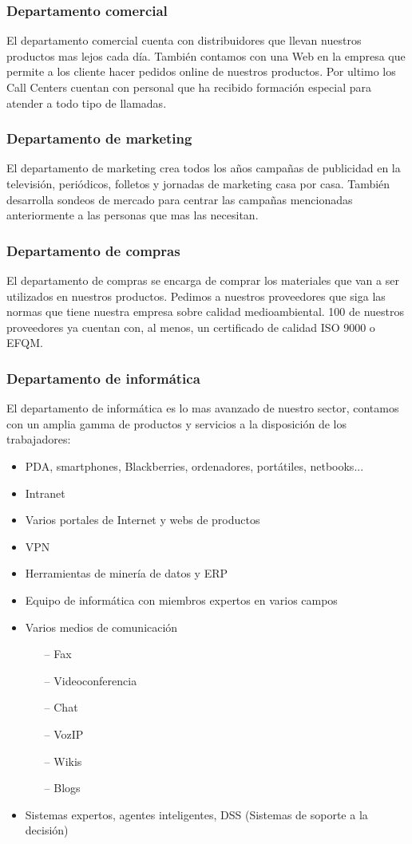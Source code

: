 \documentclass[twoside]{article}
\begin{document}
\subsubsection{Departamento comercial}
El departamento comercial cuenta con distribuidores que llevan nuestros productos mas lejos cada día. También contamos con una Web en la empresa que permite a los cliente hacer pedidos online de nuestros productos. Por ultimo los Call Centers cuentan con personal que ha recibido formación especial para atender a todo tipo de llamadas.
\subsubsection{Departamento de marketing}
El departamento de marketing crea todos los años campañas de publicidad en la televisión, periódicos, folletos y jornadas de marketing casa por casa. También desarrolla sondeos de mercado para centrar las campañas mencionadas anteriormente a las personas que mas las necesitan.
\subsubsection{Departamento de compras}
El departamento de compras se encarga de comprar los materiales que van a ser utilizados en nuestros productos. Pedimos a nuestros proveedores que siga las normas que tiene nuestra empresa sobre calidad medioambiental. 100 de nuestros proveedores ya cuentan con, al menos, un certificado de calidad ISO 9000 o EFQM.
\subsubsection{Departamento de informática}
El departamento de informática es lo mas avanzado de nuestro sector, contamos con un amplia gamma de productos y servicios a la disposición de los trabajadores:
\begin{itemize}
	\item PDA, smartphones, Blackberries, ordenadores, portátiles, netbooks...
	\item Intranet
	\item Varios portales de Internet y webs de productos
	\item VPN
	\item Herramientas de minería de datos y ERP
	\item Equipo de informática con miembros expertos en varios campos
	\item Varios medios de comunicación
		\begin{itemize}
			\item[--] Fax
			\item[--] Videoconferencia
			\item[--] Chat
			\item[--] VozIP
			\item[--] Wikis
			\item[--] Blogs
		\end{itemize}
	\item Sistemas expertos, agentes inteligentes, DSS (Sistemas de soporte a la decisión)
	
\end{itemize}
\end{document}

